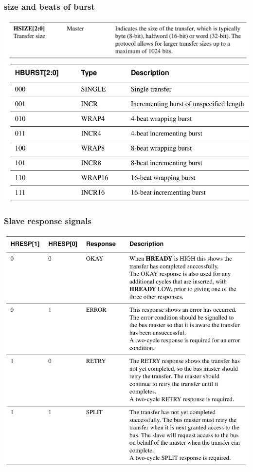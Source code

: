 \documentclass[a4paper]{scrartcl}
\begin{document}
        \subsubsection*{size and beats of burst}
        \centering\includegraphics[scale=0.4]{amba8}
        \centering\includegraphics[scale=0.4]{amba9}
        \subsubsection*{Slave response signals}
        \centering\includegraphics[scale=0.4]{amba10}
\end{document}
